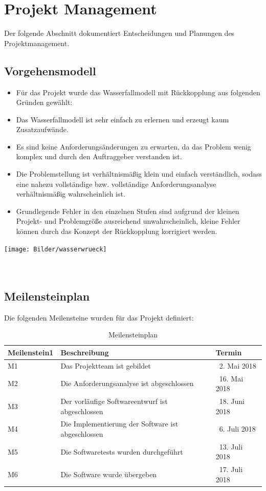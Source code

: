 \documentclass{scrartcl}
\begin{document}
\section {Projekt Management}
Der folgende Abschnitt dokumentiert Entscheidungen und Planungen des Projektmanagement.

\subsection{Vorgehensmodell}
\begin{itemize}
\item Für das Projekt wurde das Wasserfallmodell mit Rückkopplung aus folgenden Gründen gewählt:
\item Das Wasserfallmodell ist sehr einfach zu erlernen und erzeugt kaum Zusatzaufwände.
\item Es sind keine Anforderungsänderungen zu erwarten, da das Problem wenig komplex und durch den Auftraggeber verstanden ist.
\item Die Problemstellung ist verhältnismäßig klein und einfach verständlich, sodass eine nahezu vollständige bzw. vollständige Anforderungsanalyse verhältnismäßig wahrscheinlich ist.
\item Grundlegende Fehler in den einzelnen Stufen sind aufgrund der kleinen Projekt- und Problemgröße ausreichend unwahrscheinlich, kleine Fehler können durch das Konzept der Rückkopplung korrigiert werden.
\end{itemize}


\texttt{[image: Bilder/wasserwrueck]}
\\
\\
\\

\subsection{Meilensteinplan}
Die folgenden Meilensteine wurden für das Projekt definiert:

\begin{table}[h]
	\begin{tabular}{l|l|l}
	Meilenstein1 & Beschreibung & Termin \\
	\hline
	M1 & Das Projektteam ist gebildet & 2. Mai 2018 \\
	\hline
	M2 & Die Anforderungsanalyse ist abgeschlossen & 16. Mai 2018 \\
	\hline
	M3 & Der vorläufige Softwareentwurf ist abgeschlossen & 18. Juni 2018 \\
	\hline
	M4 & Die Implementierung der Software ist abgeschlossen & 6. Juli 2018 \\
	\hline
	M5 & Die Softwaretests wurden durchgeführt & 13. Juli 2018 \\
	\hline
	M6 & Die Software wurde übergeben & 17. Juli 2018 \\
	\hline
	\end{tabular}
	\caption{Meilensteinplan}
	\label{tab:Meilensteinplan}
\end{table}
\end{document}
